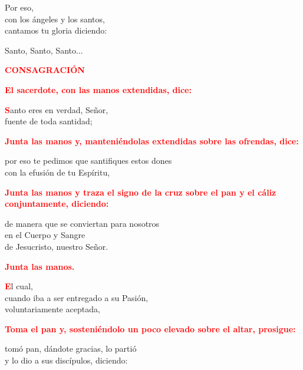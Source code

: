 \documentclass[12pt, letterpaper]{report}
\begin{document}
Por eso, \\
con los \'angeles y los santos, \\
cantamos tu gloria diciendo: \newline

Santo, Santo, Santo...

\newpage

\Large {\bfseries \textcolor{red}{CONSAGRACI\'ON}} \newline

\large{\bfseries \textcolor{red}{El sacerdote, con las manos extendidas, dice:}}

\lettrine[lines=1]{\bfseries \textcolor{red}{S}}{}\Large anto eres en verdad, Se\~nor,\\
fuente de toda santidad;\newline

\large{\bfseries \textcolor{red}{Junta las manos y, manteni\'endolas extendidas sobre las ofrendas, dice:}}\newline

\Large por eso te pedimos que santifiques estos dones\\
con la efusi\'on de tu Esp\'iritu,\newline

\large{\bfseries \textcolor{red}{Junta las manos y traza el signo de la cruz sobre el pan y el c\'aliz conjuntamente, diciendo:}}\newline

\Large de manera que se conviertan para nosotros\\
en el Cuerpo y \Huge{\textcolor{red}{}} \Large Sangre\\
de Jesucristo, nuestro Se\~nor.\newline

\large{\bfseries \textcolor{red}{Junta las manos.}}

\lettrine[lines=1]{\bfseries \textcolor{red}{E}}{}\Large l cual,\\
cuando iba a ser entregado a su Pasi\'on,\\
voluntariamente aceptada,\newline

\large{\bfseries \textcolor{red}{Toma el pan y, sosteni\'endolo un poco elevado sobre el altar, prosigue:}}\newline

\Large tom\'o pan, d\'andote gracias, lo parti\'o\\
y lo dio a sus disc\'ipulos, diciendo:\newline
\end{document}
